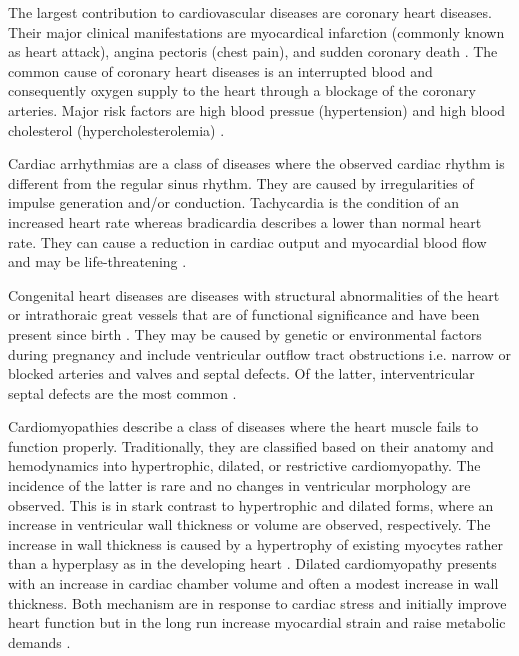The largest contribution to cardiovascular diseases are coronary heart diseases. Their major clinical manifestations are myocardical infarction (commonly known as heart attack), angina pectoris (chest pain), and sudden coronary death \citep{Wong2014}. The common cause of coronary heart diseases is an interrupted blood and consequently oxygen supply to the heart through a blockage of the coronary arteries. Major risk factors are high blood pressue (hypertension) and high blood cholesterol (hypercholesterolemia) \citep{Mackay2004}.

Cardiac arrhythmias are a class of diseases where the observed cardiac rhythm is different from the regular sinus rhythm. They are caused by irregularities of impulse generation and/or conduction. Tachycardia is the condition of an increased heart rate whereas bradicardia describes a lower than normal heart rate. They can cause a reduction in cardiac output and myocardial blood flow and may be life-threatening \citep{Durham2002}.

Congenital heart diseases are diseases with structural abnormalities of the heart or intrathoraic great vessels that are of functional significance and have been present since birth \citep{Mitchell1971}. They may be caused by genetic or environmental factors during pregnancy and include ventricular outflow tract  obstructions i.e. narrow or blocked arteries and valves and septal defects. Of the latter, interventricular septal defects are the most common \citep{Hoffman2005}.


Cardiomyopathies describe a class of diseases where the heart muscle fails to function properly. Traditionally, they are classified based on their anatomy and hemodynamics into hypertrophic, dilated, or restrictive cardiomyopathy. The incidence of the latter is rare and no changes in ventricular morphology are observed. This is in stark contrast to hypertrophic and dilated forms, where an increase in ventricular wall thickness or volume are observed, respectively. The increase in wall thickness is caused by a hypertrophy of existing myocytes rather than a hyperplasy as in the developing heart \citep{Lorell2000}. Dilated cardiomyopathy presents with an increase in cardiac chamber volume and often a modest increase in wall thickness. Both mechanism are in response to cardiac stress and initially improve heart function but in the long run increase myocardial strain and raise metabolic demands \citep{Seidman2001}.

